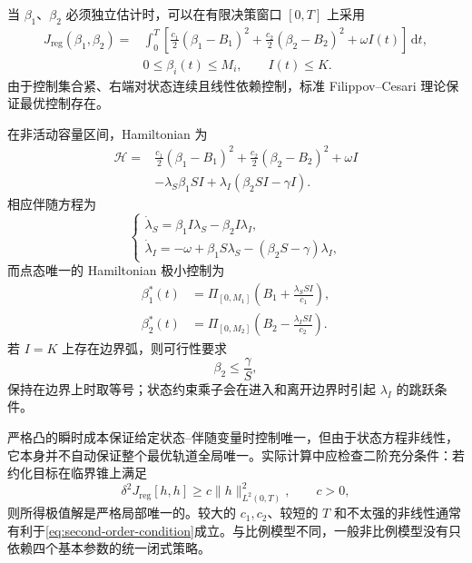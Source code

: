 \documentclass[11pt,a4paper,UTF8]{ctexart}
\theoremstyle{definition}
\newcommand{\dd}{\,\mathrm{d}}
\begin{document}
当 $\beta_1$、$\beta_2$ 必须独立估计时，可以在有限决策窗口 $[0,T]$ 上采用
\begin{equation}
\begin{aligned}
J_{\mathrm{reg}}(\beta_1,\beta_2)
={}&\int_0^T\left[
\frac{c_1}{2}(\beta_1-B_1)^2
+\frac{c_2}{2}(\beta_2-B_2)^2
+\omega I(t)
\right]\dd t,\\
&0\le\beta_i(t)\le M_i,
\qquad I(t)\le K.
\end{aligned}
\label{eq:regularized-problem}
\end{equation}
由于控制集合紧、右端对状态连续且线性依赖控制，标准 Filippov--Cesari 理论保证最优控制存在\citep{Cesari1983,Liberzon2012}。

在非活动容量区间，Hamiltonian 为
\begin{equation}
\begin{aligned}
\mathcal H={}&
\frac{c_1}{2}(\beta_1-B_1)^2
+\frac{c_2}{2}(\beta_2-B_2)^2+\omega I\\
&-\lambda_S\beta_1SI
+\lambda_I(\beta_2SI-\gamma I).
\end{aligned}
\label{eq:regularized-H}
\end{equation}
相应伴随方程为
\begin{equation}
\begin{cases}
\dot\lambda_S=\beta_1I\lambda_S-\beta_2I\lambda_I,\\
\dot\lambda_I=-\omega+\beta_1S\lambda_S-(\beta_2S-\gamma)\lambda_I,
\end{cases}
\label{eq:adjoint}
\end{equation}
而点态唯一的 Hamiltonian 极小控制为
\begin{equation}
\begin{aligned}
\beta_1^*(t)&=\Pi_{[0,M_1]}
\left(B_1+\frac{\lambda_SSI}{c_1}\right),\\
\beta_2^*(t)&=\Pi_{[0,M_2]}
\left(B_2-\frac{\lambda_ISI}{c_2}\right).
\end{aligned}
\label{eq:projection-controls}
\end{equation}
若 $I=K$ 上存在边界弧，则可行性要求
\begin{equation}
\beta_2\le\frac{\gamma}{S},
\label{eq:independent-boundary-viability}
\end{equation}
保持在边界上时取等号；状态约束乘子会在进入和离开边界时引起 $\lambda_I$ 的跳跃条件。

严格凸的瞬时成本保证给定状态--伴随变量时控制唯一，但由于状态方程非线性，它本身并不自动保证整个最优轨道全局唯一。实际计算中应检查二阶充分条件：若约化目标在临界锥上满足
\begin{equation}
\delta^2J_{\mathrm{reg}}[h,h]\ge c\|h\|_{L^2(0,T)}^2,
\qquad c>0,
\label{eq:second-order-condition}
\end{equation}
则所得极值解是严格局部唯一的。较大的 $c_1,c_2$、较短的 $T$ 和不太强的非线性通常有利于\eqref{eq:second-order-condition}成立。与比例模型不同，一般非比例模型没有只依赖四个基本参数的统一闭式策略。
\end{document}
